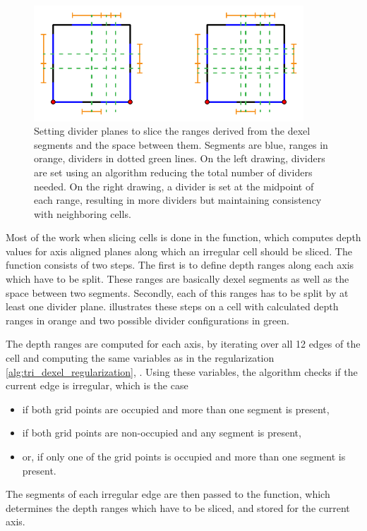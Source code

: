 \begin{figure}
	\centering
	\includegraphics[width=0.9\textwidth]{images/cellslicing_dividers}
	\caption{
		Setting divider planes to slice the ranges derived from the dexel segments and the space between them.
		Segments are blue, ranges in orange, dividers in dotted green lines.
		On the left drawing, dividers are set using an algorithm reducing the total number of dividers needed.
		On the right drawing, a divider is set at the midpoint of each range, resulting in more dividers but maintaining consistency with neighboring cells.
	}
	\label{fig:cellslicing_dividers}
\end{figure}

Most of the work when slicing cells is done in the  function, which computes depth values for axis aligned planes along which an irregular cell should be sliced.
The function consists of two steps.
The first is to define depth ranges along each axis which have to be split.
These ranges are basically dexel segments as well as the space between two segments.
Secondly, each of this ranges has to be split by at least one divider plane.
 illustrates these steps on a cell with calculated depth ranges in orange and two possible divider configurations in green.

The depth ranges are computed for each axis, by iterating over all 12 edges of the cell and computing the same variables as in the regularization \cref{alg:tri_dexel_regularization}, .
Using these variables, the algorithm checks if the current edge is irregular, which is the case
\begin{itemize}
	\item if both grid points are occupied and more than one segment is present,
	\item if both grid points are non-occupied and any segment is present,
	\item or, if only one of the grid points is occupied and more than one segment is present.
\end{itemize}
The segments of each irregular edge are then passed to the  function, which determines the depth ranges which have to be sliced, and stored for the current axis.


